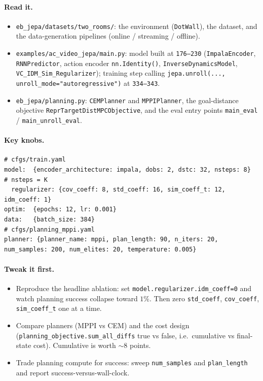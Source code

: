 \documentclass{article}
\newcommand{\code}[1]{\texttt{\small #1}}
\newcommand{\file}[1]{\texttt{\small #1}}
\begin{document}
\paragraph{Read it.}
\begin{itemize}[leftmargin=1.4em,itemsep=1pt,topsep=2pt]
  \item \file{eb\_jepa/datasets/two\_rooms/}: the environment (\code{DotWall}), the
    dataset, and the data-generation pipelines (online / streaming / offline).
  \item \file{examples/ac\_video\_jepa/main.py}: model built at \code{176--230}
    (\code{ImpalaEncoder}, \code{RNNPredictor}, action encoder
    \code{nn.Identity()}, \code{InverseDynamicsModel}, \code{VC\_IDM\_Sim\_Regularizer});
    training step calling \code{jepa.unroll(..., unroll\_mode="autoregressive")} at
    \code{334--343}.
  \item \file{eb\_jepa/planning.py}: \code{CEMPlanner} and \code{MPPIPlanner}, the
    goal-distance objective \code{ReprTargetDistMPCObjective}, and the eval entry
    points \code{main\_eval} / \code{main\_unroll\_eval}.
\end{itemize}

\paragraph{Key knobs.}
\begin{lstlisting}[style=yml]
# cfgs/train.yaml
model:  {encoder_architecture: impala, dobs: 2, dstc: 32, nsteps: 8}  # nsteps = K
  regularizer: {cov_coeff: 8, std_coeff: 16, sim_coeff_t: 12, idm_coeff: 1}
optim:  {epochs: 12, lr: 0.001}
data:   {batch_size: 384}
# cfgs/planning_mppi.yaml
planner: {planner_name: mppi, plan_length: 90, n_iters: 20, num_samples: 200, num_elites: 20, temperature: 0.005}
\end{lstlisting}

\paragraph{Tweak it first.}
\begin{itemize}[leftmargin=1.4em,itemsep=1pt,topsep=2pt]
  \item Reproduce the headline ablation: set \code{model.regularizer.idm\_coeff=0}
    and watch planning success collapse toward $1\%$. Then zero
    \code{std\_coeff}, \code{cov\_coeff}, \code{sim\_coeff\_t} one at a time.
  \item Compare planners (MPPI vs CEM) and the cost design
    (\code{planning\_objective.sum\_all\_diffs} true vs false, i.e.\ cumulative vs
    final-state cost). Cumulative is worth $\sim$8 points.
  \item Trade planning compute for success: sweep \code{num\_samples} and
    \code{plan\_length} and report success-versus-wall-clock.
\end{itemize}
\end{document}
